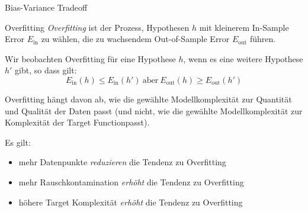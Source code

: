 \begin{defi}{Bias-Variance Tradeoff}
    \begin{center}
    \end{center}
\end{defi}

\begin{defi}{Overfitting}
    \emph{Overfitting} ist der Prozess, Hypothesen $h$ mit kleinerem In-Sample Error $E_\text{in}$ zu wählen, die zu wachsendem Out-of-Sample Error $E_\text{out}$ führen.

    Wir beobachten Overfitting für eine Hypothese $h$, wenn es eine weitere Hypothese $h'$ gibt, so dass gilt:
    \[
        E_\text{in}(h) \leq E_\text{in}(h') \ \text{aber} \ E_\text{out}(h) \geq E_\text{out}(h')
    \]

    Overfitting hängt davon ab, wie die gewählte Modellkomplexität zur Quantität und Qualität der Daten passt (und nicht, wie die gewählte Modellkomplexität zur Komplexität der Target Functionpasst).

    Es gilt:
    \begin{itemize}
        \item mehr Datenpunkte \emph{reduzieren} die Tendenz zu Overfitting
        \item mehr Rauschkontamination \emph{erhöht} die Tendenz zu Overfitting
        \item höhere Target Komplexität \emph{erhöht} die Tendenz zu Overfitting
    \end{itemize}
\end{defi}

